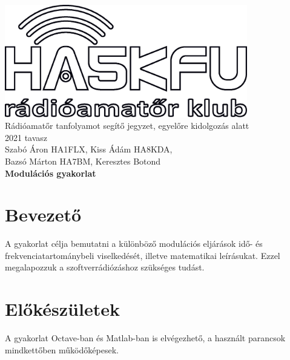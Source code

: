 \documentclass[12pt,a4paper]{article}
\begin{document}
\begin{center}
\includegraphics[width=300pt,keepaspectratio]{figures/ha5kfu.eps}
\\[0.5cm]
Rádióamatőr tanfolyamot segítő jegyzet, egyelőre kidolgozás alatt \\
2021 tavasz \\[0.5cm]
Szabó Áron HA1FLX, Kiss Ádám HA8KDA, \\ Bazsó Márton HA7BM, Keresztes Botond%
\\[1cm]

{\huge \bfseries Modulációs gyakorlat \\[0.5cm]}



\end{center}

\renewcommand{\contentsname}{Tartalom}\tableofcontents 
\newpage

\newpage

\section{Bevezető}
A gyakorlat célja bemutatni a különböző modulációs eljárások idő- és frekvenciatartománybeli viselkedését, illetve matematikai leírásukat. Ezzel megalapozzuk a szoftverrádiózáshoz szükséges tudást.

\section{Előkészületek}
A gyakorlat Octave-ban és Matlab-ban is elvégezhető, a használt parancsok mindkettőben működőképesek.
\end{document}
